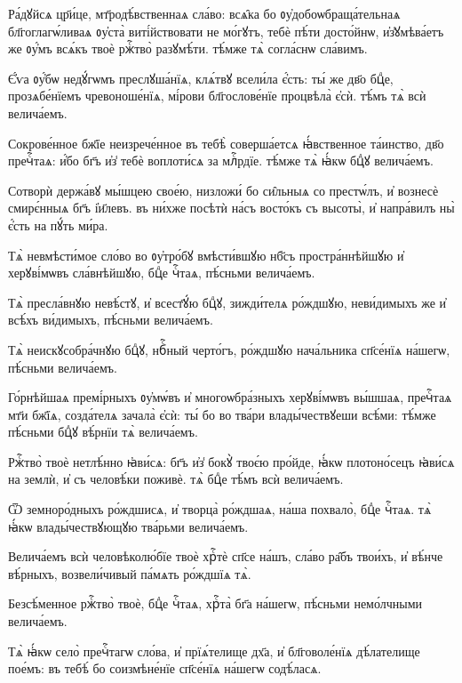 \hKv Ра́дꙋйсѧ цр҃и́це, мт҃родѣ́вственнаѧ  сла́во: всѧ̑ка бо ᲂу҆добоѡбраща́тельнаѧ бл҃гоглагѡ́ливаѧ  ᲂу҆ста̀ виті́йствовати не мо́гꙋтъ, тебѐ пѣ́ти досто́йнѡ,  и҆з̾ꙋмѣва́етъ  же  ᲂу҆́мъ  всѧ́къ твоѐ ржⷭ҇тво̀ разꙋмѣ́ти. тѣ́мже тѧ̀ согла́снѡ  сла́вимъ.  
%

\hKv Є҆́ѵа ᲂу҆́бѡ недꙋ́гѡмъ преслꙋша́нїѧ, клѧ́твꙋ всели́ла  є҆́сть: ты́ же дв҃о бцⷣе, прозѧбе́нїемъ чревоноше́нїѧ,  мі́рови бл҃гослове́нїе процвѣла̀ є҆сѝ. тѣ́мъ тѧ̀ всѝ  велича́емъ. 

\hKv Сокрове́нное бж҃їе неизрече́нное въ тебѣ̀ соверша́етсѧ  ꙗ҆́вственное та́инство, дв҃о пречⷭ҇таѧ: и҆́бо бг҃ъ и҆з̾  тебѐ воплоти́сѧ за млⷭ҇рдїе. тѣ́мже тѧ̀ ꙗ҆́кѡ бцⷣꙋ  велича́емъ. 

\hKv Сотворѝ держа́вꙋ мы́шцею свое́ю, низложи́ бо си̑льныѧ со  престѡ́лъ, и҆ вознесѐ смирє́нныѧ бг҃ъ і҆и҃левъ. въ ни́хже  посѣтѝ на́съ восто́къ съ высоты̀, и҆ напра́вилъ ны̀  є҆́сть на пꙋ́ть ми́ра. 

\hKv Тѧ̀ невмѣсти́мое сло́во во ᲂу҆тро́бꙋ вмѣсти́вшꙋю нб҃съ  простра́ннѣйшꙋю и҆ херꙋві́мѡвъ сла́внѣйшꙋю, бцⷣе чⷭ҇таѧ,  пѣ́сньми велича́емъ. 

\hKv Тѧ̀ пресла́внꙋю невѣ́стꙋ, и҆ всест҃ꙋ́ю бцⷣꙋ,  зижди́телѧ ро́ждшꙋю, неви́димыхъ же и҆  всѣ́хъ ви́димыхъ, пѣ́сньми велича́емъ. 

\hKv Тѧ̀ неискꙋсобра́чнꙋю бцⷣꙋ, нбⷭ҇ный черто́гъ, ро́ждшꙋю  нача́льника сп҃се́нїѧ на́шегѡ, пѣ́сньми велича́емъ. 

\hKv Го́рнѣйшаѧ премі́рныхъ ᲂу҆мѡ́въ и҆ многоѡбра́зныхъ  херꙋві́мѡвъ вы́шшаѧ, пречⷭ҇таѧ мт҃и бж҃їѧ, созда́телѧ  зачала̀ є҆сѝ: ты́ бо во тва́ри влады́чествꙋеши всѣ́ми:  тѣ́мже пѣ́сньми бцⷣꙋ вѣ́рнїи тѧ̀ велича́емъ. 
%

\hKv Ржⷭ҇тво̀ твоѐ нетлѣ́нно ꙗ҆ви́сѧ: бг҃ъ  и҆з̾ бокꙋ̀ твоє́ю про́йде, ꙗ҆́кѡ плотоно́сецъ ꙗ҆ви́сѧ на  землѝ, и҆ съ человѣ́ки поживѐ. тѧ̀ бцⷣе тѣ́мъ всѝ  велича́емъ. 

\hKv Ѿ земноро́дныхъ ро́ждшисѧ, и҆ творца̀ ро́ждшаѧ, на́ша  похвало̀, бцⷣе чⷭ҇таѧ. тѧ̀ ꙗ҆́кѡ влады́чествꙋющꙋю тва́рьми  велича́емъ. 

\hKv Велича́емъ всѝ человѣколю́бїе твоѐ хрⷭ҇тѐ сп҃се на́шъ,  сла́во ра̑бъ твои́хъ, и҆ вѣ́нче вѣ́рныхъ, возвели́чивый  па́мѧть ро́ждшїѧ тѧ̀.  

\hKv Безсѣ́менное ржⷭ҇тво̀ твоѐ, бцⷣе чⷭ҇таѧ, хрⷭ҇та̀ бг҃а  на́шегѡ, пѣ́сньми немо́лчными велича́емъ. 

\hKv Тѧ̀ ꙗ҆́кѡ село̀ пречⷭ҇тагѡ сло́ва, и҆ прїѧ́телище дх҃а, и҆  бл҃говоле́нїѧ дѣ́лателище пое́мъ: въ тебѣ́ бо  соизмѣне́нїе сп҃се́нїѧ на́шегѡ содѣ́ласѧ. 

